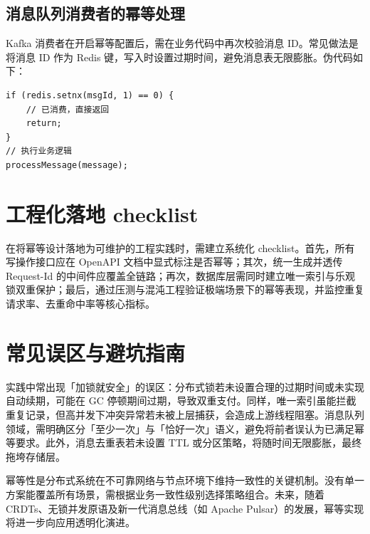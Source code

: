 \section{消息队列消费者的幂等处理}
Kafka 消费者在开启幂等配置后，需在业务代码中再次校验消息 ID。常见做法是将消息 ID 作为 Redis 键，写入时设置过期时间，避免消息表无限膨胀。伪代码如下：\par
\begin{lstlisting}
if (redis.setnx(msgId, 1) == 0) {
    // 已消费，直接返回
    return;
}
// 执行业务逻辑
processMessage(message);
\end{lstlisting}
\chapter{工程化落地 checklist}
在将幂等设计落地为可维护的工程实践时，需建立系统化 checklist。首先，所有写操作接口应在 OpenAPI 文档中显式标注是否幂等；其次，统一生成并透传 Request-Id 的中间件应覆盖全链路；再次，数据库层需同时建立唯一索引与乐观锁双重保护；最后，通过压测与混沌工程验证极端场景下的幂等表现，并监控重复请求率、去重命中率等核心指标。\par
\chapter{常见误区与避坑指南}
实践中常出现「加锁就安全」的误区：分布式锁若未设置合理的过期时间或未实现自动续期，可能在 GC 停顿期间过期，导致双重支付。同样，唯一索引虽能拦截重复记录，但高并发下冲突异常若未被上层捕获，会造成上游线程阻塞。消息队列领域，需明确区分「至少一次」与「恰好一次」语义，避免将前者误认为已满足幂等要求。此外，消息去重表若未设置 TTL 或分区策略，将随时间无限膨胀，最终拖垮存储层。\par
幂等性是分布式系统在不可靠网络与节点环境下维持一致性的关键机制。没有单一方案能覆盖所有场景，需根据业务一致性级别选择策略组合。未来，随着 CRDTs、无锁并发原语及新一代消息总线（如 Apache Pulsar）的发展，幂等实现将进一步向应用透明化演进。\par
